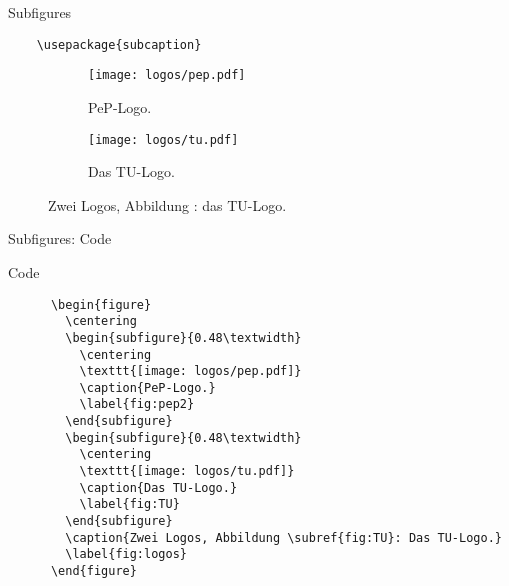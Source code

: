 \begin{frame}[fragile]{Subfigures\hfill {}}
  \begin{Packages}
    \begin{lstlisting}
    \usepackage{subcaption}
    \end{lstlisting}
  \end{Packages}
      \begin{figure}
        \centering
        \begin{subfigure}{0.48\textwidth}
          \centering
          \texttt{[image: logos/pep.pdf]}
          \caption{PeP-Logo.}
          \label{fig:pep2}
        \end{subfigure}
        \begin{subfigure}{0.48\textwidth}
          \centering
          \texttt{[image: logos/tu.pdf]}
          \caption{Das TU-Logo.}
          \label{fig:TU}
        \end{subfigure}
        \caption{Zwei Logos, Abbildung : das TU-Logo.}\label{fig:logos}
      \end{figure}
\end{frame}

\begin{frame}[fragile]{Subfigures: Code}
  \vspace{-3pt}
  \begin{block}{Code}
    \begin{lstlisting}
      \begin{figure}
        \centering
        \begin{subfigure}{0.48\textwidth}
          \centering
          \texttt{[image: logos/pep.pdf]}
          \caption{PeP-Logo.}
          \label{fig:pep2}
        \end{subfigure}
        \begin{subfigure}{0.48\textwidth}
          \centering
          \texttt{[image: logos/tu.pdf]}
          \caption{Das TU-Logo.}
          \label{fig:TU}
        \end{subfigure}
        \caption{Zwei Logos, Abbildung \subref{fig:TU}: Das TU-Logo.}
        \label{fig:logos}
      \end{figure}
    \end{lstlisting}
  \end{block}
\end{frame}

